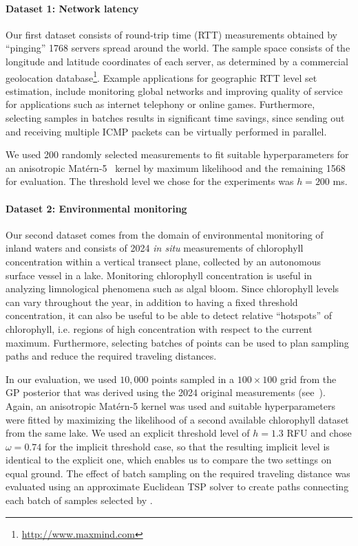 \paragraph{Dataset 1: Network latency}
Our first dataset consists of round-trip time (RTT) measurements obtained
by ``pinging'' 1768 servers spread around the world.
The sample space consists of the longitude and latitude coordinates of each
server, as determined by a commercial geolocation
database\footnote{\url{http://www.maxmind.com}}.
Example applications for geographic RTT level set estimation, include
monitoring global networks and improving quality of service for applications
such as internet telephony or online games. Furthermore,
selecting samples in batches results in significant time savings, since
sending out and receiving multiple ICMP packets can be virtually performed in
parallel.

We used 200 randomly selected measurements to fit suitable hyperparameters for
an anisotropic Mat\'{e}rn-5~\mbox{\cite{rasmussen06}} kernel by maximum
likelihood  and the remaining 1568 for evaluation.
The threshold level we chose for the experiments was $h = 200$ ms.


\paragraph{Dataset 2: Environmental monitoring}
Our second dataset comes from the domain of environmental monitoring of inland
waters and consists of 2024 \emph{in situ} measurements of chlorophyll
concentration within a vertical transect plane, collected by an autonomous
surface vessel in a lake.
Monitoring chlorophyll concentration is useful in analyzing limnological
phenomena such as algal bloom. Since chlorophyll levels can vary throughout
the year, in addition to having a fixed threshold concentration, 
it can also be useful to be able to detect
relative ``hotspots'' of chlorophyll, i.e. regions of high concentration
with respect to the current maximum. Furthermore, selecting batches of points
can be used to plan sampling paths and reduce the required traveling
distances.

In our evaluation, we used $10,000$ points sampled in a $100 \times 100$ grid
from the GP posterior that was derived using the 2024 original measurements
(see~).
Again, an anisotropic Mat\'{e}rn-5 kernel was used and suitable
hyperparameters were fitted by maximizing the
likelihood of a second available chlorophyll dataset from the same lake.
We used an explicit threshold level of $h = 1.3$ RFU and chose $\omega = 0.74$
for the implicit threshold case, so that the resulting implicit level is
identical to the explicit one, which enables us to compare the two settings on
equal ground.
The effect of batch sampling on the required traveling distance was evaluated
using an approximate Euclidean TSP solver to create paths connecting each
batch of samples selected by \bacl.

